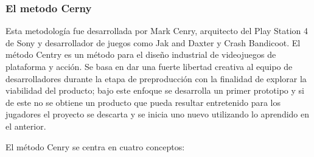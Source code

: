 \subsubsection{El metodo Cerny}
Esta metodología fue desarrollada por Mark Cenry, arquitecto del Play Station 4 
de Sony y desarrollador de juegos como Jak and Daxter y Crash Bandicoot. El 
método Centry es un método para el diseño industrial de videojuegos de plataforma 
y acción. Se basa en dar una fuerte libertad creativa al equipo de desarrolladores 
durante la etapa de preproducción con la finalidad de explorar la viabilidad 
del producto; bajo este enfoque se desarrolla un primer prototipo y si de este 
no se obtiene un producto que pueda resultar entretenido para los jugadores el 
proyecto se descarta y se inicia uno nuevo utilizando lo aprendido en el anterior.
\\
\par
El método Cenry se centra en cuatro conceptos:
